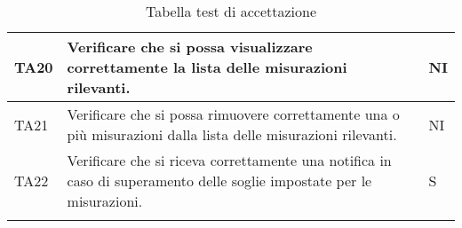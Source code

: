 \begin{longtable}{|C{1.9cm}|L{5cm}|C{2cm}|}
    TA20 & Verificare che si possa visualizzare correttamente la lista delle misurazioni rilevanti. & NI \\
    \hline
    
    TA21 & Verificare che si possa rimuovere correttamente una o più misurazioni dalla lista delle misurazioni rilevanti. & NI \\
    \hline
    
    TA22 & Verificare che si riceva correttamente una notifica in caso di superamento delle soglie impostate per le misurazioni. & S \\
    \hline
    
    \caption{Tabella test di accettazione}
\end{longtable}

\pagebreak